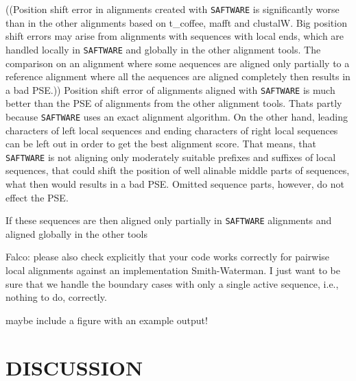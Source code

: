 \documentclass[a4paper,10pt]{article}
\newcommand{\TODO}[1]{\begingroup\color{red}#1\endgroup}
\newcommand{\SAFTWARE}{\TODO{\texttt{SAFTWARE}}}
\begin{document}
{((Position shift error in alignments created with \SAFTWARE{} is significantly worse than in the other alignments based on t\_coffee, mafft and clustalW. Big position shift errors may arise from alignments with sequences with local ends, which are handled locally in \SAFTWARE{} and globally in the other alignment tools. The comparison on an alignment where some aequences are aligned only partially to a reference alignment where all the aequences are aligned completely then results in a bad PSE.)) Position shift error of alignments aligned with \SAFTWARE{} is much better than the PSE of alignments from the other alignment tools. Thats partly because \SAFTWARE{} uses an exact alignment algorithm. On the other hand, leading characters of left local sequences and ending characters of right local sequences can be left out in order to get the best alignment score. That means, that \SAFTWARE{} is not aligning only moderately suitable prefixes and suffixes of local sequences, that could shift the position of well alinable middle parts of sequences, what then would results in a bad PSE. Omitted sequence parts, however, do not effect the PSE.

If these sequences are then aligned only partially in \SAFTWARE{} alignments and aligned globally in the other tools
}

\TODO{Falco: please also check explicitly that your code works correctly
  for pairwise local alignments against an implementation Smith-Waterman.
  I just want to be sure that we handle the boundary cases with only a
  single active sequence, i.e., nothing to do, correctly.} 

\TODO{maybe include a figure with an example output!} 

\section{\uppercase{Discussion}}
\end{document}
